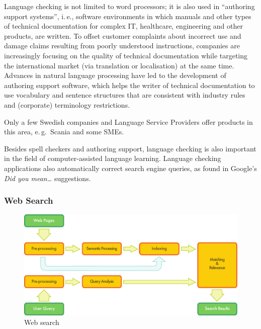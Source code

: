 \begin{multicols}{2}

Language checking is not limited to word processors; it is also used in “authoring support systems”, i.\,e., software environments in which manuals and other types of technical documentation for complex IT, healthcare, engineering and other products, are written. To offset customer complaints about incorrect use and damage claims resulting from poorly understood instructions, companies are increasingly focusing on the quality of technical documentation while targeting the international market (via translation or localisation) at the same time. Advances in natural language processing have led to the development of authoring support software, which helps the writer of technical documentation to use vocabulary and sentence structures that are consistent with industry rules and (corporate) terminology restrictions.

Only a few Swedish companies and Language Service Providers offer products in this area, e.\,g.~Scania and some SMEs.

Besides spell checkers and authoring support, language checking is also important in the field of computer-assisted language learning. Language checking applications also automatically correct search engine queries, as found in Google's \textit{Did you mean…} suggestions.

\subsubsection{Web Search}

\begin{figure}[htb]
  \center
  \includegraphics[width=\textwidth]{../_media/english/web_search_architecture}
  \caption{Web search}
  \label{fig:websearcharch_en}
 \end{figure}


\end{multicols}
